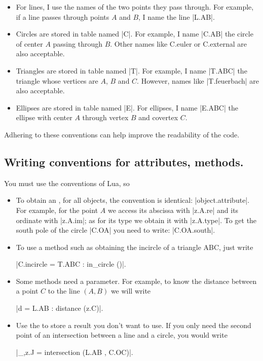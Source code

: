 \begin{itemize}
  \item 
  For lines, I use the names of the two points they pass through. For example, if a line passes through points  $A$ and $B$, I name the line |L.AB|. 

\item Circles are stored in table named |C|.
  For example, I name |C.AB| the circle of center $A$ passing through $B$. Other names like C.euler or C.external are also acceptable.

\item Triangles are stored in table named |T|.
  For example, I name |T.ABC| the triangle whose vertices are $A$, $B$ and $C$. However, names like |T.feuerbach| are also acceptable. 

\item Ellipses are stored in table named |E|.
  For ellipses, I name |E.ABC| the ellipse with center $A$ through vertex $B$ and covertex $C$.
\end{itemize}

Adhering to these conventions can help improve the readability of the code.


\subsection{Writing conventions for attributes, methods.} %
\label{sub:writing_conventions_for_attributes_methods_and_functions}

You must use the conventions of Lua, so

\begin{itemize}
   \item To obtain an , for all objects, the convention is identical: |object.attribute|. For example, for the point $A$ we access its abscissa with |z.A.re| and its ordinate with |z.A.im|; as for its type we obtain it with |z.A.type|. To get the south pole of the circle |C.OA| you need to write: |C.OA.south|.
   
   \item To use a method such as obtaining the incircle of a triangle ABC, just write  
   
   |C.incircle = T.ABC : in_circle ()|. 
   
   \item Some methods need a parameter. For example, to know the distance between a point  $C$  to the line $(A,B)$ we will write 
   
   |d = L.AB : distance (z.C)|.
   
   \item Use the  to store a result you don't want to use. If you only need the second point of an intersection between a line and a circle, you would write 
   
   |_,z.J = intersection (L.AB , C.OC)|.

\end{itemize}
\endinput